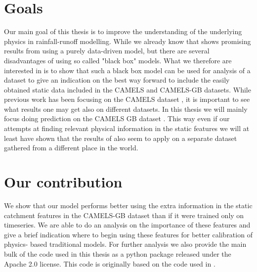 \section{Goals}
Our main goal of this thesis is to improve the understanding of the underlying 
physics in rainfall-runoff modelling. While we already know that \cite{lstm_third_paper} 
shows promising results from using a purely data-driven model, but there are several 
disadvantages of using so called "black box" models. What we therefore are interested 
in is to show that such a black box model can be used for analysis of a dataset 
to give an indication on the best way forward to include the easily obtained 
static data included in the CAMELS \cite{CAMELS_US} and CAMELS-GB \cite{CAMELS_GB} 
datasets. 
While previous work has been focusing on the 
CAMELS dataset \cite{CAMELS_US}, it is important to see what results one may get 
also on different datasets. In this thesis we will mainly focus doing prediction on 
the CAMELS GB dataset \cite{CAMELS_GB}. This way even if our attempts at finding 
relevant physical information in the static features we will at least have shown 
that the results of \cite{lstm_third_paper} also seem to apply on a separate dataset 
gathered from a different place in the world. 
\section{Our contribution}
We show that our model performs better using the extra information in the static 
catchment features in the CAMELS-GB dataset than if it were trained only on timeseries.
We are able to do an analysis on the importance of these features and give a brief 
indication where to begin using these features for better calibration of physics-
based traditional models. For further analysis we also provide the main bulk of 
the code used in this thesis as a python package released under the Apache 2.0 
license. This code is originally based on the code used in \cite{lstm_second_paper}.

